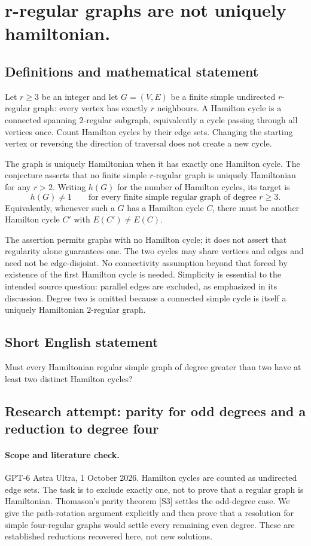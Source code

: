 \documentclass[11pt,a4paper]{article}
\begin{document}
\section*{r-regular graphs are not uniquely hamiltonian.}\label{statement}

\subsection{Definitions and mathematical statement}
Let $r\geq3$ be an integer and let $G=(V,E)$ be a finite simple
undirected $r$-regular graph: every vertex has exactly $r$
neighbours. A Hamilton cycle is a connected spanning
$2$-regular subgraph, equivalently a cycle passing through
all vertices once. Count Hamilton cycles by their edge sets.
Changing the starting vertex or reversing the direction of
traversal does not create a new cycle.

The graph is uniquely Hamiltonian when it has exactly one
Hamilton cycle. The conjecture asserts that no finite simple
$r$-regular graph is uniquely Hamiltonian for any $r>2$.
Writing $h(G)$ for the number of Hamilton cycles, its target
is
\[
 h(G)\neq1\qquad
 \text{for every finite simple regular graph of degree }r\geq3.
\]
Equivalently, whenever such a $G$ has a Hamilton cycle $C$,
there must be another Hamilton cycle $C'$ with
$E(C')\neq E(C)$.

The assertion permits graphs with no Hamilton cycle; it
does not assert that regularity alone guarantees one. The
two cycles may share vertices and edges and need not be
edge-disjoint. No connectivity assumption beyond that
forced by existence of the first Hamilton cycle is needed.
Simplicity is essential to the intended source question:
parallel edges are excluded, as emphasized in its discussion.
Degree two is omitted because a connected simple cycle is
itself a uniquely Hamiltonian $2$-regular graph.
\subsection{Short English statement}
Must every Hamiltonian regular simple graph of degree greater than two have at least two distinct Hamilton cycles?
\subsection{Research attempt: parity for odd degrees and a reduction to degree four}
\paragraph{Scope and literature check.}
GPT-6 Astra Ultra, 1 October 2026. Hamilton cycles are counted as
undirected edge sets. The task is to exclude exactly one, not to
prove that a regular graph is Hamiltonian. Thomason's parity theorem
[S3] settles the odd-degree case. We give the path-rotation argument
explicitly and then prove that a resolution for simple four-regular
graphs would settle every remaining even degree. These are established
reductions recovered here, not new solutions.
\end{document}
